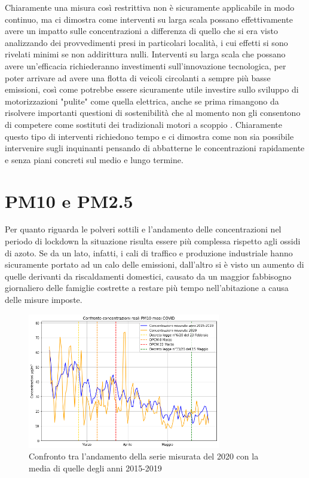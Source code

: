 Chiaramente una misura così restrittiva non è sicuramente applicabile in modo continuo, ma ci dimostra come interventi su larga scala possano effettivamente avere un
 impatto sulle concentrazioni a differenza di quello che si era visto analizzando dei provvedimenti presi in particolari località, i cui effetti si sono rivelati minimi se non addirittura nulli.
Interventi su larga scala che possano avere un'efficacia richiederanno investimenti sull'innovazione tecnologica, per poter arrivare ad avere una flotta di veicoli circolanti a sempre più basse emissioni, così come potrebbe essere sicuramente utile investire sullo sviluppo di motorizzazioni "pulite" come quella elettrica, anche se prima rimangono da risolvere importanti questioni di sostenibilità che al momento non gli consentono di competere come sostituti dei tradizionali motori a scoppio \cite{skonhoft2014norwegian, jones2019if}.
Chiaramente questo tipo di interventi richiedono tempo
 e ci dimostra come non sia possibile intervenire sugli inquinanti pensando di abbatterne le concentrazioni rapidamente e senza piani concreti sul medio e lungo termine.

\section{PM10 e PM2.5}
Per quanto riguarda le polveri sottili e l'andamento delle concentrazioni nel periodo di lockdown la situazione risulta essere più complessa rispetto agli ossidi di azoto.
Se da un lato, infatti, i cali di traffico e produzione industriale hanno sicuramente portato ad un calo delle emissioni, dall'altro si è visto un aumento di quelle derivanti da riscaldamenti domestici, causato da un maggior fabbisogno giornaliero delle famiglie costrette a restare più tempo nell'abitazione a causa delle misure imposte. 

\begin{figure}[h]
\centering
\includegraphics[width=0.75\textwidth]{pm10_covid}
\caption{Confronto tra l'andamento della serie misurata del 2020 con la media di quelle degli anni 2015-2019}
\label{fig:pm10_covid}
\end{figure}


